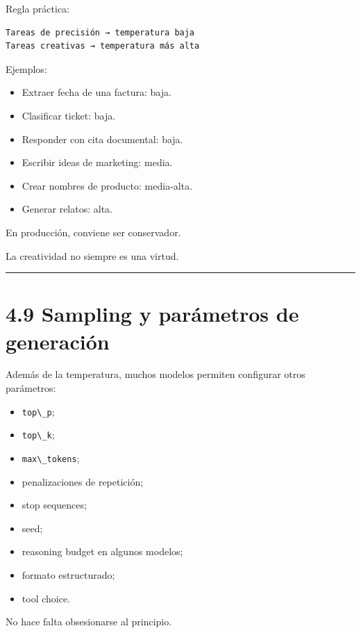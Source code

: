 Regla práctica:

\begin{lstlisting}
Tareas de precisión → temperatura baja
Tareas creativas → temperatura más alta
\end{lstlisting}

Ejemplos:

\begin{itemize}
\tightlist
\item
  Extraer fecha de una factura: baja.
\item
  Clasificar ticket: baja.
\item
  Responder con cita documental: baja.
\item
  Escribir ideas de marketing: media.
\item
  Crear nombres de producto: media-alta.
\item
  Generar relatos: alta.
\end{itemize}

En producción, conviene ser conservador.

La creatividad no siempre es una virtud.

\begin{center}\rule{0.5\linewidth}{0.5pt}\end{center}

\section{4.9 Sampling y parámetros de
generación}\label{sampling-y-paruxe1metros-de-generaciuxf3n}

Además de la temperatura, muchos modelos permiten configurar otros
parámetros:

\begin{itemize}
\tightlist
\item
  \passthrough{\lstinline!top\_p!};
\item
  \passthrough{\lstinline!top\_k!};
\item
  \passthrough{\lstinline!max\_tokens!};
\item
  penalizaciones de repetición;
\item
  stop sequences;
\item
  seed;
\item
  reasoning budget en algunos modelos;
\item
  formato estructurado;
\item
  tool choice.
\end{itemize}

No hace falta obsesionarse al principio.

